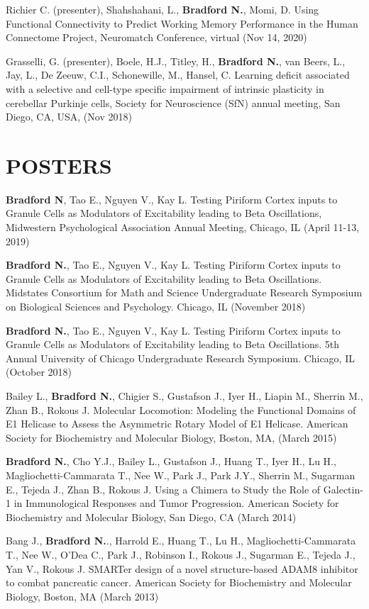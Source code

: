 \documentclass[margin, 10pt]{res} %
\begin{document}
\begin{resume}
Richier C. (presenter), Shahshahani, L., \textbf{Bradford N.}, Momi, D. Using Functional Connectivity to Predict Working Memory Performance in the Human Connectome Project, Neuromatch Conference, virtual (Nov 14, 2020)

Grasselli, G. (presenter), Boele, H.J., Titley, H., \textbf{Bradford N.}, van Beers, L., Jay, L., De Zeeuw, C.I., Schonewille, M., Hansel, C. Learning deficit associated with a selective and cell-type specific impairment of intrinsic plasticity in cerebellar Purkinje cells, Society for Neuroscience (SfN) annual meeting, San Diego, CA, USA, (Nov 2018)

\section{POSTERS}

\textbf{Bradford N}, Tao E., Nguyen V., Kay L. Testing Piriform Cortex inputs to Granule Cells as Modulators of Excitability leading to Beta Oscillations, Midwestern Psychological Association Annual Meeting, Chicago, IL (April 11-13, 2019)

\textbf{Bradford N.}, Tao E., Nguyen V., Kay L. Testing Piriform Cortex inputs to Granule Cells as Modulators of Excitability leading to Beta Oscillations. Midstates Consortium for Math and Science Undergraduate Research Symposium on Biological Sciences and Psychology. Chicago, IL (November 2018) 

\textbf{Bradford N.}, Tao E., Nguyen V., Kay L. Testing Piriform Cortex inputs to Granule Cells as Modulators of Excitability leading to Beta Oscillations. 5th Annual University of Chicago Undergraduate Research Symposium. Chicago, IL (October 2018)

Bailey L., \textbf{Bradford N.}, Chigier S., Gustafson J., Iyer H., Liapin M., Sherrin M., Zhan B., Rokous J. Molecular Locomotion: Modeling the Functional Domains of E1 Helicase to Assess the Asymmetric Rotary Model of E1 Helicase. American Society for Biochemistry and Molecular Biology, Boston, MA, (March 2015)

\textbf{Bradford N.}, Cho Y.J., Bailey L., Gustafson J., Huang T., Iyer H., Lu H., Magliochetti-Cammarata T., Nee W., Park J., Park J.Y., Sherrin M., Sugarman E., Tejeda J., Zhan B., Rokous J. Using a Chimera to Study the Role of Galectin-1 in Immunological Responses and Tumor Progression. American Society for Biochemistry and Molecular Biology, San Diego, CA (March 2014)

Bang J., \textbf{Bradford N.}., Harrold E., Huang T., Lu H., Magliochetti-Cammarata T., Nee W., O'Dea C., Park J., Robinson I., Rokous J., Sugarman E., Tejeda J., Yan V., Rokous J. SMARTer design of a novel structure-based ADAM8 inhibitor to combat pancreatic cancer. American Society for Biochemistry and Molecular Biology, Boston, MA (March 2013)


\end{resume}
\end{document}
